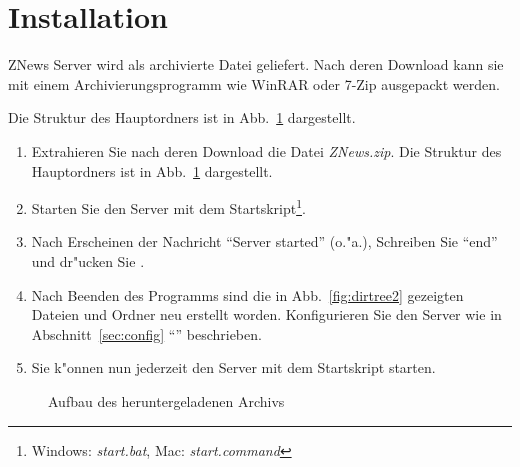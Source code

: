 \begin{titlepage}

        \vfill

    \end{titlepage}



    \newpage
    \tableofcontents
    \newpage

    \section{Installation}

    ZNews Server wird als archivierte Datei geliefert.
    Nach deren Download kann sie mit einem Archivierungsprogramm
    wie WinRAR oder 7-Zip ausgepackt werden.

    Die Struktur des Hauptordners ist in Abb.~\ref{fig:dirtree1}
    dargestellt.

    \begin{enumerate}
        \item Extrahieren Sie nach deren Download die Datei \emph{ZNews.zip}.
        Die Struktur des Hauptordners ist in Abb.~\ref{fig:dirtree1} dargestellt.
        \item Starten Sie den Server mit dem Startskript\footnote{%
        Windows: \emph{start.bat}, Mac: \emph{start.command}}.
        \item Nach Erscheinen der Nachricht ``Server started'' (o."a.),
        Schreiben Sie ``end'' und dr"ucken Sie .
        \item Nach Beenden des Programms sind die in Abb.~\ref{fig:dirtree2}
        gezeigten Dateien und Ordner neu erstellt worden.
        Konfigurieren Sie den Server wie in Abschnitt~\ref{sec:config} ``'' beschrieben.
        \item Sie k"onnen nun jederzeit den Server mit dem Startskript starten.
    \end{enumerate}

    \begin{figure}[htb]
        \caption{\label{fig:dirtree1}Aufbau des heruntergeladenen Archivs}
    \end{figure}

